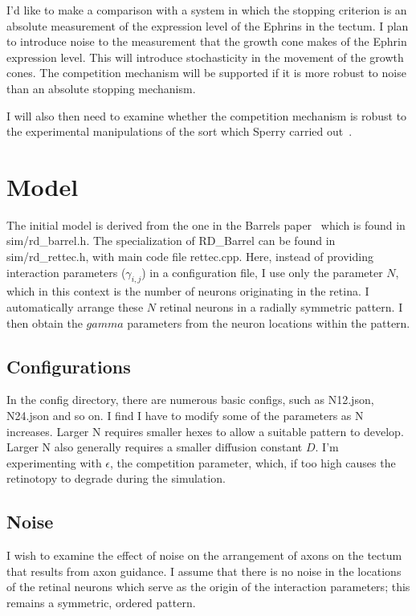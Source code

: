 \documentclass[11pt, a4paper]{article}
\newcommand{\code}[1]{\textsf{#1}}
\begin{document}
I'd like to make a comparison with a system in which the stopping criterion is
an absolute measurement of the expression level of the Ephrins in the
tectum. I plan to introduce noise to the measurement that the growth cone
makes of the Ephrin expression level. This will introduce stochasticity in the
movement of the growth cones. The competition mechanism will be supported if
it is more robust to noise than an absolute stopping mechanism.

I will also then need to examine whether the competition mechanism is robust
to the experimental manipulations of the sort which Sperry carried
out~\cite{sperry_chemoaffinity_1963,goodhill_retinotectal_1999,goodhill_development_2005}.

\section{Model}

The initial model is derived from the one in the Barrels
paper~\cite{james_modelling_2020} which is found
in \code{sim/rd\_barrel.h}. The specialization of \code{RD\_Barrel} can be
found in \code{sim/rd\_rettec.h}, with main code file \code{rettec.cpp}. Here,
instead of providing interaction parameters ($\gamma_{i,j}$) in a
configuration file, I use only the parameter $N$, which in this context is the
number of neurons originating in the retina. I automatically arrange these $N$
retinal neurons in a radially symmetric pattern. I then obtain the $gamma$
parameters from the neuron locations within the pattern.

\subsection{Configurations}

In the config directory, there are numerous basic configs, such as N12.json,
N24.json and so on. I find I have to modify some of the parameters as N
increases. Larger N requires smaller hexes to allow a suitable pattern to
develop. Larger N also generally requires a smaller diffusion constant
$D$. I'm experimenting with $\epsilon$, the competition parameter, which, if
too high causes the retinotopy to degrade during the simulation.

\subsection{Noise}

I wish to examine the effect of noise on the arrangement of axons on the
tectum that results from axon guidance. I assume that there is no noise in the
locations of the retinal neurons which serve as the origin of the interaction
parameters; this remains a symmetric, ordered pattern.
\end{document}
